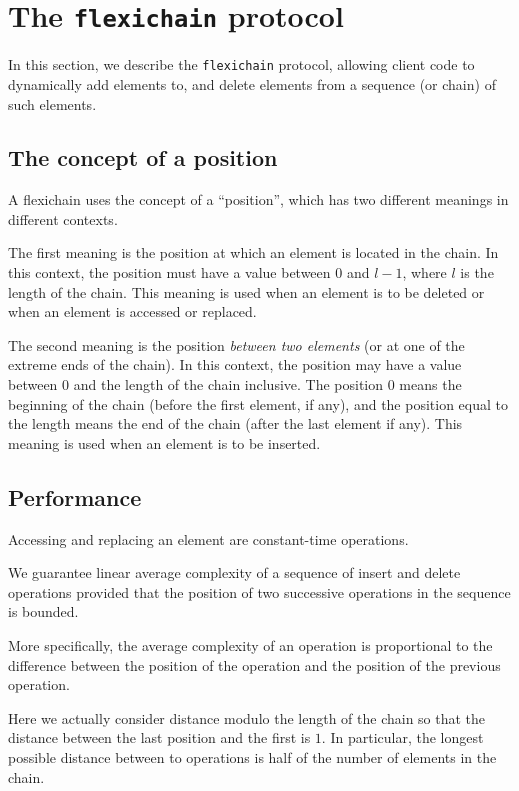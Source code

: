 \documentclass[11pt]{article}
\begin{document}
\section{The \texttt{flexichain} protocol}

In this section, we describe the \texttt{flexichain} protocol,
allowing client code to dynamically add elements to, and delete
elements from a sequence (or chain) of such elements. 

\subsection{The concept of a position}

A flexichain uses the concept of a ``position'', which has two
different meanings in different contexts.

The first meaning is the position at which an element is located in
the chain.  In this context, the position must have a value between 0
and $l-1$, where $l$ is the length of the chain.  This meaning is used
when an element is to be deleted or when an element is accessed or
replaced.

The second meaning is the position \textit{between two
elements} (or at one of the extreme ends of the chain).
In this context, the position may have a value between 0 and the
length of the chain inclusive. The position 0 means the beginning of
the chain (before the first element, if any), and the
position equal to the length means the end of the chain
(after the last element if any).  This meaning is used when an element
is to be inserted.

\subsection{Performance}

Accessing and replacing an element are constant-time operations. 

We guarantee linear average complexity of a sequence of insert and
delete operations provided that the position of two successive
operations in the sequence is bounded.

More specifically, the average complexity of an operation is
proportional to the difference between the position of the operation
and the position of the previous operation.

Here we actually consider distance modulo the length of the chain so
that the distance between the last position and the first is $1$.
In particular, the longest possible distance between to operations is
half of the number of elements in the chain.
\end{document}

